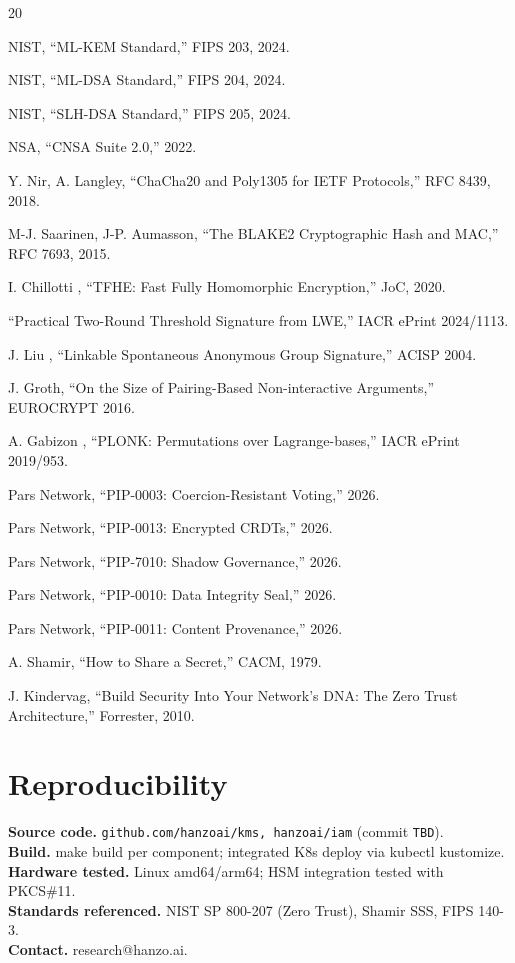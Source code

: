 \documentclass[11pt,letterpaper]{article}
\begin{document}
\begin{thebibliography}{20}

 NIST, ``ML-KEM Standard,'' FIPS 203, 2024.

 NIST, ``ML-DSA Standard,'' FIPS 204, 2024.

 NIST, ``SLH-DSA Standard,'' FIPS 205, 2024.

 NSA, ``CNSA Suite 2.0,'' 2022.

 Y. Nir, A. Langley, ``ChaCha20 and Poly1305 for IETF Protocols,'' RFC 8439, 2018.

 M-J. Saarinen, J-P. Aumasson, ``The BLAKE2 Cryptographic Hash and MAC,'' RFC 7693, 2015.

 I. Chillotti \etal, ``TFHE: Fast Fully Homomorphic Encryption,'' JoC, 2020.

 ``Practical Two-Round Threshold Signature from LWE,'' IACR ePrint 2024/1113.

 J. Liu \etal, ``Linkable Spontaneous Anonymous Group Signature,'' ACISP 2004.

 J. Groth, ``On the Size of Pairing-Based Non-interactive Arguments,'' EUROCRYPT 2016.

 A. Gabizon \etal, ``PLONK: Permutations over Lagrange-bases,'' IACR ePrint 2019/953.

 Pars Network, ``PIP-0003: Coercion-Resistant Voting,'' 2026.

 Pars Network, ``PIP-0013: Encrypted CRDTs,'' 2026.

 Pars Network, ``PIP-7010: Shadow Governance,'' 2026.

 Pars Network, ``PIP-0010: Data Integrity Seal,'' 2026.

 Pars Network, ``PIP-0011: Content Provenance,'' 2026.

 A. Shamir, ``How to Share a Secret,'' CACM, 1979.

 J. Kindervag, ``Build Security Into Your Network's DNA: The Zero Trust Architecture,'' Forrester, 2010.

\end{thebibliography}

\section*{Reproducibility}
\textbf{Source code.} \texttt{github.com/hanzoai/kms, hanzoai/iam} (commit \texttt{TBD}).\\
\textbf{Build.} make build per component; integrated K8s deploy via kubectl kustomize.\\
\textbf{Hardware tested.} Linux amd64/arm64; HSM integration tested with PKCS\#11.\\
\textbf{Standards referenced.} NIST SP 800-207 (Zero Trust), Shamir SSS, FIPS 140-3.\\
\textbf{Contact.} research@hanzo.ai.
\end{document}
